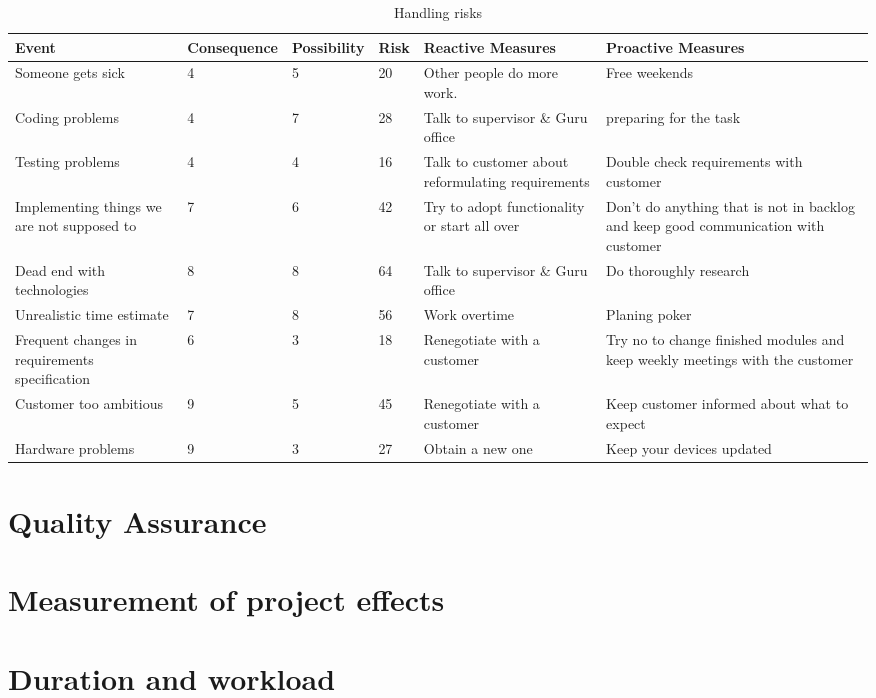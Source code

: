 \begin{table*}
    \caption{Handling risks}
    \label{tab:risks}
    
    \centering {}
    \vspace{2mm} %
    \begin{tabularx}{500pt}{XlllXX}
    \toprule
        Event & Consequence & Possibility & Risk  & Reactive Measures & Proactive Measures \\
    \midrule
Someone gets sick & 4     & 5     & 20    & Other people do more work.  & Free weekends \\
Coding problems & 4     & 7     & 28    & Talk to supervisor \& Guru office & preparing for the task \\
Testing problems & 4     & 4     & 16    & Talk to customer about reformulating requirements & Double check requirements with customer \\
Implementing things we are not supposed to & 7     & 6     & 42    & Try to adopt functionality or start all over & Don't do anything that is not in backlog and keep good communication with customer \\
Dead end with technologies & 8     & 8     & 64    & Talk to supervisor \& Guru office & Do thoroughly research \\
Unrealistic time estimate & 7     & 8     & 56    & Work overtime  & Planing poker \\
Frequent changes in requirements specification & 6     & 3     & 18    & Renegotiate with a customer & Try no to change finished modules and keep weekly meetings with the customer \\
Customer too ambitious & 9     & 5     & 45    & Renegotiate with a customer & Keep customer informed about what  to expect \\
Hardware problems & 9     & 3     & 27    & Obtain a new one & Keep your devices updated \\
\bottomrule
\end{tabularx}
\end{table*}

\section{Quality Assurance}
\section{Measurement of project effects}
\section{Duration and workload}
